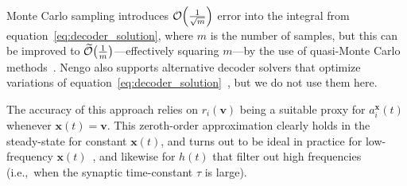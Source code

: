 \documentclass[12pt]{article}
\theoremstyle{definition}
\renewcommand{\vec}{\mathbf}  %
\let\originalleft\left
\let\originalright\right
\renewcommand{\left}{\mathopen{}\mathclose\bgroup\originalleft}
\renewcommand{\right}{\aftergroup\egroup\originalright}
\begin{document}
Monte Carlo sampling introduces $\mathcal{O} \left( \frac{1}{\sqrt{m}} \right)$ error into the integral from equation~\ref{eq:decoder_solution}, where $m$ is the number of samples, but this can be improved to $\widetilde{\mathcal{O}} \left( \frac{1}{m} \right)$---effectively squaring $m$---by the use of quasi-Monte Carlo methods~\citep{fang1994, voelker2016b}.
Nengo also supports alternative decoder solvers that optimize variations of equation~\ref{eq:decoder_solution}~\citep[e.g.,][]{voelker2016a, abrams2017}, but we do not use them here.


The accuracy of this approach relies on $r_i(\vec{v})$ being a suitable proxy for $a_i^\vec{x}(t)$ whenever $\vec{x}(t) = \vec{v}$.
This zeroth-order approximation clearly holds in the steady-state for constant $\vec{x}(t)$, and turns out to be ideal in practice for low-frequency $\vec{x}(t)$~\citep[][appendix~F.1]{eliasmith2003neural}, and likewise for $h(t)$ that filter out high frequencies (i.e.,~when the synaptic time-constant $\tau$ is large).
\end{document}
